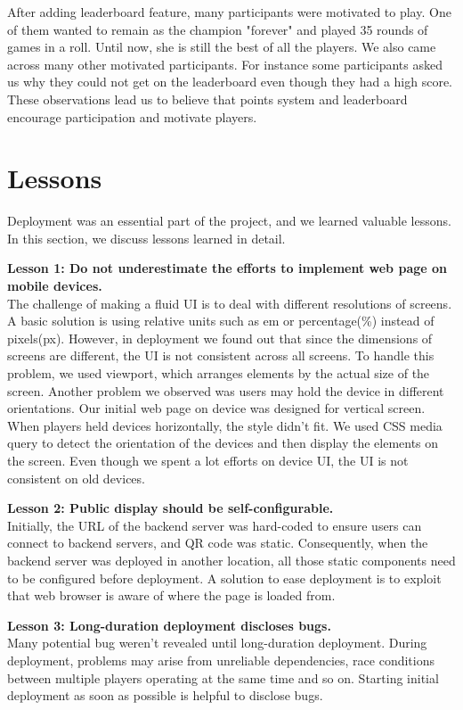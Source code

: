 \documentclass{sig-alternate}
\begin{document}
After adding leaderboard feature, many participants were motivated to play. One of them wanted to remain as the champion "forever" and played 35 rounds of games in a roll. Until now, she is still the best of all the players. We also came across many other motivated participants. For instance some participants asked us why they could not get on the leaderboard even though they had a high score. These observations lead us to believe that points system and leaderboard encourage participation and motivate players.

\section{Lessons}

Deployment was an essential part of the project\cite{storz:deployment_lessons}, and we learned valuable lessons.
In this section, we discuss lessons learned in detail.

\textbf{Lesson 1: Do not underestimate the efforts to implement web page on mobile devices.}\\
The challenge of making a fluid UI is to deal with different resolutions of screens. A basic solution is using relative units such as em or percentage(\%) instead of pixels(px). However, in deployment we found out that since the dimensions of screens are different, the UI is not consistent across all screens. To handle this problem, we used viewport, which arranges elements by the actual size of the screen. Another problem we observed was users may hold the device in different orientations. Our initial web page on device was designed for vertical screen. When players held devices horizontally, the style didn't fit. We used CSS media query to detect the orientation of the devices and then display the elements on the screen. Even though we spent a lot efforts on device UI, the UI is not consistent on old devices.
 
\textbf{Lesson 2: Public display should be self-configurable.}\\
Initially, the URL of the backend server was hard-coded to ensure users can connect to backend servers, and QR code was static. Consequently, when the backend server was deployed in another location, all those static components need to be configured before deployment. A solution to ease deployment is to exploit that web browser is aware of where the page is loaded from.

\textbf{Lesson 3: Long-duration deployment discloses bugs.}\\
Many potential bug weren't revealed until long-duration deployment. During deployment, problems may arise from unreliable dependencies, race conditions between multiple players operating at the same time and so on. Starting initial deployment as soon as possible is helpful to disclose bugs.
\end{document}
